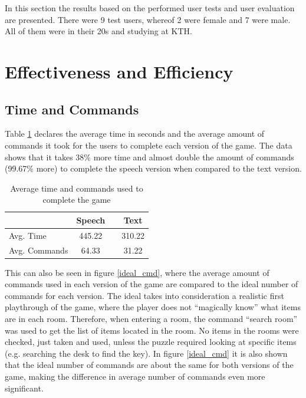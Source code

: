 In this section the results based on the performed user tests and user evaluation are presented. There were 9 test users, whereof 2 were female and 7 were male. All of them were in their 20s and studying at KTH.

\section{Effectiveness and Efficiency}

\subsection{Time and Commands}
Table \ref{fig:avg_data} declares the average time in seconds and the average amount of commands it took for the users to complete each version of the game. The data shows that it takes 38\% more time and almost double the amount of commands (99.67\% more) to complete the speech version when compared to the text version.

\begin{table}[ht]
  \centering
  \begin{tabular}{l|ccc}
    \toprule
     & Speech &   & Text\\
    \midrule
    Avg. Time & 445.22 &   & 310.22\\
    Avg. Commands & 64.33 &   & 31.22\\
    \bottomrule
  \end{tabular}
  \caption{Average time and commands used to complete the game}\label{fig:avg_data}
\end{table}

This can also be seen in figure \ref{ideal_cmd}, where the average amount of commands used in each version of the game are compared to the ideal number of commands for each version. The ideal takes into consideration a realistic first playthrough of the game, where the player does not ``magically know'' what items are in each room. Therefore, when entering a room, the command “search room” was used to get the list of items located in the room. No items in the rooms were checked, just taken and used, unless the puzzle required looking at specific items (e.g. searching the desk to find the key). In figure \ref{ideal_cmd} it is also shown that the ideal number of commands are about the same for both versions of the game, making the difference in average number of commands even more significant.

